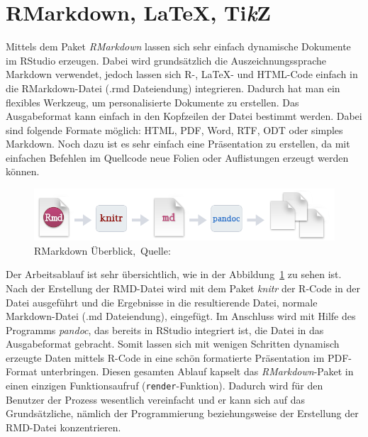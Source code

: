 \section{RMarkdown, \LaTeX, Ti\textit{k}Z}
\label{sec:RMarkdown}
Mittels dem Paket \emph{RMarkdown} lassen sich sehr einfach dynamische Dokumente im RStudio erzeugen. Dabei wird grundsätzlich die Auszeichnungssprache Markdown verwendet, jedoch lassen sich R-, \LaTeX - und HTML-Code einfach in die RMarkdown-Datei (.rmd Dateiendung) integrieren. Dadurch hat man ein flexibles Werkzeug, um personalisierte Dokumente zu erstellen. Das Ausgabeformat kann einfach in den Kopfzeilen der Datei bestimmt werden. Dabei sind folgende Formate möglich: HTML, PDF, Word, RTF, ODT oder simples Markdown. Noch dazu ist es sehr einfach eine Präsentation zu erstellen, da mit einfachen Befehlen im Quellcode neue Folien oder Auflistungen erzeugt werden können.

\begin{figure}[th]
\centering
\includegraphics[width=\ScaleIfNeeded]{pictures/RMarkdown}
\caption{RMarkdown Überblick,~Quelle:~\cite{rmarkdown}}
\label{pic:RMarkdown}
\end{figure}

Der Arbeitsablauf ist sehr übersichtlich, wie in der Abbildung~\ref{pic:RMarkdown} zu sehen ist. Nach der Erstellung der RMD-Datei wird mit dem Paket \emph{knitr} der R-Code in der Datei ausgeführt und die Ergebnisse in die resultierende Datei, normale Markdown-Datei (.md Dateiendung), eingefügt. Im Anschluss wird mit Hilfe des Programms \emph{pandoc}, das bereits in RStudio integriert ist, die Datei in das Ausgabeformat gebracht. Somit lassen sich mit wenigen Schritten dynamisch erzeugte Daten mittels R-Code in eine schön formatierte Präsentation im PDF-Format unterbringen. Diesen gesamten Ablauf kapselt das \emph{RMarkdown}-Paket in einen einzigen Funktionsaufruf (\texttt{render}-Funktion). Dadurch wird für den Benutzer der Prozess wesentlich vereinfacht und er kann sich auf das Grundsätzliche, nämlich der Programmierung beziehungsweise der Erstellung der RMD-Datei konzentrieren.~\cite{rmarkdown}

